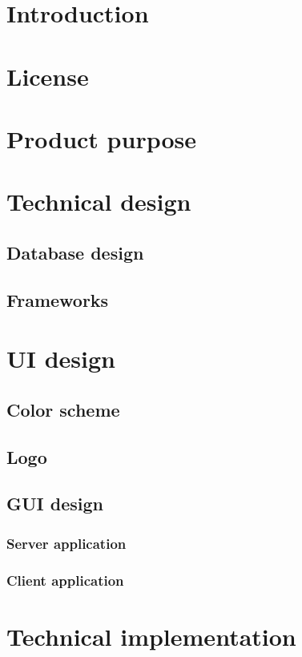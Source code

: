 \pagestyle{fancy}
\lhead{}
\renewcommand{\headrulewidth}{0pt}
\setlength{\headheight}{14pt}

\chapter{Introduction}

\chapter{License}

\chapter{Product purpose}

\chapter{Technical design}
\section{Database design}
\section{Frameworks}

\chapter{UI design}
\section{Color scheme}
\section{Logo}
\section{GUI design}
\subsection{Server application}
\subsection{Client application}

\chapter{Technical implementation}
